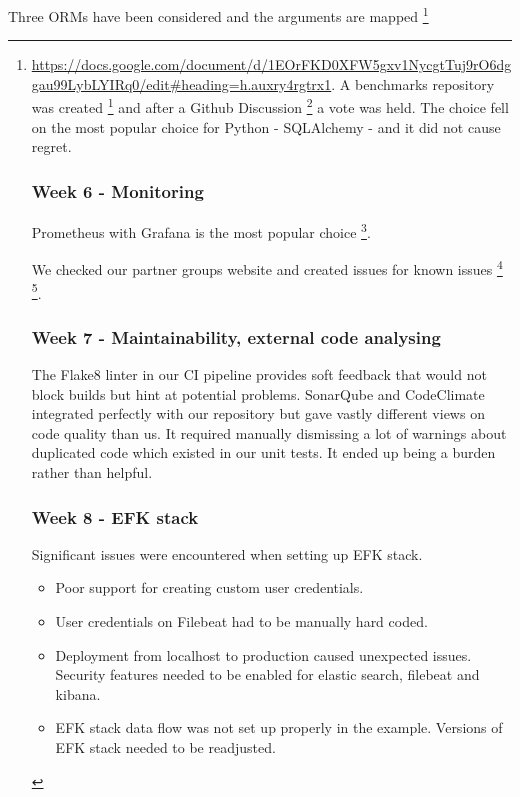 \documentclass{article}
\begin{document}
Three ORMs have been considered and the arguments are mapped \footnote{\url{https://docs.google.com/document/d/1EOrFKD0XFW5gxv1NycgtTuj9rO6dggau99LybLYIRq0/edit#heading=h.auxry4rgtrx1}. A benchmarks repository was created \footnote{\url{https://github.com/MinitwitGroupI/ORM_Benchmarks }} and after a Github Discussion \footnote{\url{https://github.com/MinitwitGroupI/MiniTwit/discussions/57 }} a vote was held. The choice fell on the most popular choice for Python - SQLAlchemy - and it did not cause regret. 

\subsubsection{Week 6 - Monitoring }
Prometheus with Grafana is the most popular choice \footnote{https://stackshare.io/stackups/grafana-vs-nagios}. 

We checked our partner groups website and created issues for known issues \footnote{\url{https://github.com/organizationGB/DevOps/issues/23}} \footnote{\url{https://github.com/organizationGB/DevOps/issues/25}}. 



\subsubsection{Week 7 - Maintainability, external code analysing }

The Flake8 linter in our CI pipeline provides soft feedback that would not block builds but hint at potential problems. SonarQube and CodeClimate integrated perfectly with our repository but gave vastly different views on code quality than us. It required manually dismissing a lot of warnings about duplicated code which existed in our unit tests. It ended up being a burden rather than helpful.   


\subsubsection{Week 8 - EFK stack}

Significant issues were encountered when setting up EFK stack.
\begin{itemize}
    \item Poor support for creating custom user credentials.
    \item User credentials on Filebeat had to be manually hard coded.
    \item Deployment from localhost to production caused unexpected issues. Security features needed to be enabled for elastic search, filebeat and kibana. 
    \item EFK stack data flow was not set up properly in the example. Versions of EFK stack needed to be readjusted.
\end{itemize}

}
\end{document}
